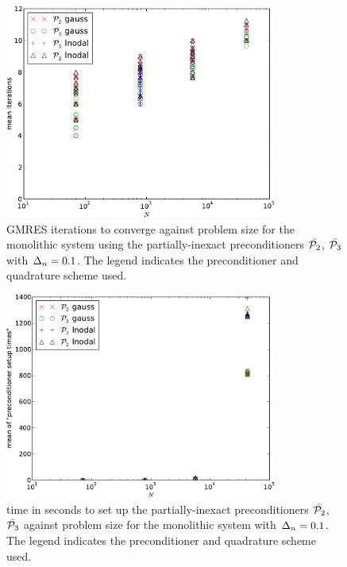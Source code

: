 \begin{figure}
  \centering
  \includegraphics[width=0.8\textwidth]{plots/linear_solvers_p2p3/implicitexact-meanofnsolveritersvsinitialnnode.pdf}
  \caption{
    \newtonmean{}
    GMRES iterations to converge against problem size for the monolithic system using the partially-inexact preconditioners $\bar{\mathcal{P}_2}$, $\bar{\mathcal{P}_3}$ with $\Delta_{n}=0.1$.
The legend indicates the preconditioner and quadrature scheme used.
\manydatapointsPrecLegend{}
}
  \label{fig:its-p23-exact}
\end{figure}

\begin{figure}
  \centering
  \includegraphics[width=0.8\textwidth]{plots/linear_solvers_p2p3/implicitexact-meanofpreconditionersetuptimesvsinitialnnode.pdf}
  \caption{
    \newtonmean{}
    time in seconds to set up the partially-inexact preconditioners $\bar{\mathcal{P}_2}$, $\bar{\mathcal{P}_3}$ against problem size for the monolithic system with $\Delta_{n}=0.1$.
    The legend indicates the preconditioner and quadrature scheme used.
    \manydatapointsPrecLegend{}
}
  \label{fig:times-p23-exact}
\end{figure}



